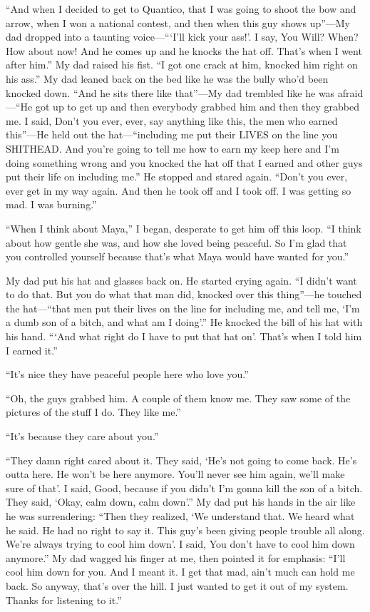 \documentclass[12pt]{book}
\begin{document}
``And when I decided to get to Quantico, that I was going to shoot the bow and arrow, when I won a national contest, and then when this guy shows up''---My dad dropped into a taunting voice---```I'll kick your ass!'. I say, You Will? When? How about now! And he comes up and he knocks the hat off. That's when I went after him.'' My dad raised his fist. ``I got one crack at him, knocked him right on his ass.'' My dad leaned back on the bed like he was the bully who'd been knocked down. ``And he sits there like that''---My dad trembled like he was afraid ---``He got up to get up and then everybody grabbed him and then they grabbed me. I said, Don't you ever, ever, say anything like this, the men who earned this''---He held out the hat---``including me put their LIVES on the line you SHITHEAD. And you're going to tell me how to earn my keep here and I'm doing something wrong and you knocked the hat off that I earned and other guys put their life on including me.'' He stopped and stared again. ``Don't you ever, ever get in my way again. And then he took off and I took off. I was getting so mad. I was burning.''

``When I think about Maya,'' I began, desperate to get him off this loop. ``I think about how gentle she was, and how she loved being peaceful. So I'm glad that you controlled yourself because that's what Maya would have wanted for you.''

My dad put his hat and glasses back on. He started crying again. ``I didn't want to do that. But you do what that man did, knocked over this thing''---he touched the hat---``that men put their lives on the line for including me, and tell me, `I'm a dumb son of a bitch, and what am I doing'.'' He knocked the bill of his hat with his hand. ```And what right do I have to put that hat on'. That's when I told him I earned it.''

``It's nice they have peaceful people here who love you.''

``Oh, the guys grabbed him. A couple of them know me. They saw some of the pictures of the stuff I do. They like me.''

``It's because they care about you.''

``They damn right cared about it. They said, `He's not going to come back. He's outta here. He won't be here anymore. You'll never see him again, we'll make sure of that'. I said, Good, because if you didn't I'm gonna kill the son of a bitch. They said, `Okay, calm down, calm down'.'' My dad put his hands in the air like he was surrendering: ``Then they realized, `We understand that. We heard what he said. He had no right to say it. This guy's been giving people trouble all along. We're always trying to cool him down'. I said, You don't have to cool him down anymore.'' My dad wagged his finger at me, then pointed it for emphasis: ``I'll cool him down for you. And I meant it. I get that mad, ain't much can hold me back. So anyway, that's over the hill. I just wanted to get it out of my system. Thanks for listening to it.''
\end{document}
